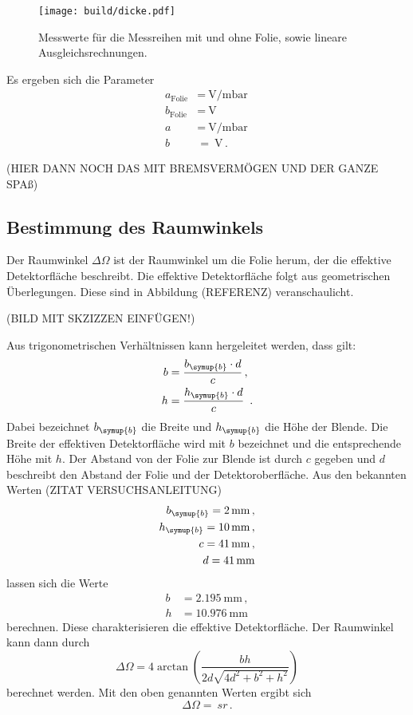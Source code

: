 \begin{figure}
  \centering
  \texttt{[image: build/dicke.pdf]}
  \caption{Messwerte für die Messreihen mit und ohne Folie, sowie lineare Ausgleichsrechnungen.}
  \label{fig:dicke}
\end{figure}

Es ergeben sich die Parameter
\begin{align}
  a_{\text{Folie}}&=\SI{}{\volt\per\milli\bar} \, \\
  b_{\text{Folie}}&=\SI{}{\volt} \,\\
  a&=\SI{}{\volt\per\milli\bar} \, \\
  b&=\SI{}{\volt} \,.
\end{align}

(HIER DANN NOCH DAS MIT BREMSVERMÖGEN UND DER GANZE SPAß)

\subsection{Bestimmung des Raumwinkels}
\label{subsec:raumwinkel}

Der Raumwinkel $\Delta \Omega$ ist der Raumwinkel um die Folie herum, der die
effektive Detektorfläche beschreibt. Die effektive Detektorfläche folgt aus geometrischen
Überlegungen. Diese sind in Abbildung (REFERENZ) veranschaulicht.

(BILD MIT SKZIZZEN EINFÜGEN!)

Aus trigonometrischen Verhältnissen kann hergeleitet werden, dass gilt:
\begin{align*}
  b &= \frac{b_\symup{b} \cdot d}{c} \,,\\
  h &= \frac{h_\symup{b} \cdot d}{c} \,.
\end{align*}
Dabei bezeichnet $b_\symup{b}$ die Breite und $h_\symup{b}$ die Höhe der Blende.
Die Breite der effektiven Detektorfläche wird mit $b$ bezeichnet und die entsprechende Höhe mit $h$.
Der Abstand von der Folie zur Blende ist durch $c$ gegeben und $d$ beschreibt den Abstand
der Folie und der Detektoroberfläche. Aus den bekannten Werten (ZITAT VERSUCHSANLEITUNG)
\begin{align*}
  b_\symup{b} = \SI{2}{\milli\meter} \,, \\
  h_\symup{b} = \SI{10}{\milli\meter} \,, \\
  c = \SI{41}{\milli\meter} \,,\\
  d = \SI{41}{\milli\meter}
\end{align*}
lassen sich die Werte
\begin{align*}
  b &= \SI{2.195}{\milli\meter} \,,\\
  h &= \SI{10.976}{\milli\meter}
\end{align*}
berechnen. Diese charakterisieren die effektive Detektorfläche. Der Raumwinkel kann dann durch
\begin{equation}
  \Delta \Omega = 4 \arctan\left(\frac{b h}{2d \sqrt{4d^2 + b^2 + h^2}}\right)
\end{equation}
berechnet werden. Mit den oben genannten Werten ergibt sich
\begin{equation*}
  \Delta \Omega = \SI{}{sr} \,.
\end{equation*}

